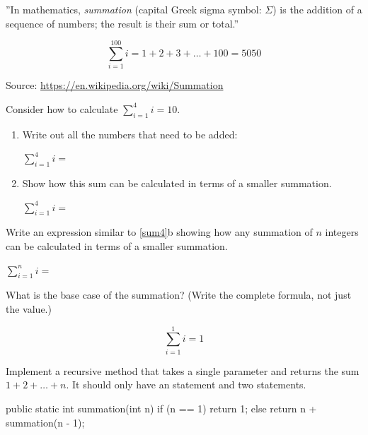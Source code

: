 
''In mathematics, \emph{summation} (capital Greek sigma symbol: $\Sigma$) is the addition of a sequence of numbers; the result is their sum or total.''

$$ \sum_{i=1}^{100} i = 1 + 2 + 3 + \ldots + 100 = 5050 $$

\smallskip\hfill
Source: \url{https://en.wikipedia.org/wiki/Summation}




\Q \label{sum4}
Consider how to calculate $\sum\limits_{i=1}^{4} i = 10$.

\begin{enumerate}
\item Write out all the numbers that need to be added:

$\sum\limits_{i=1}^{4} i =$ 

\item Show how this sum can be calculated in terms of a smaller summation.

$\sum\limits_{i=1}^{4} i =$ 
\end{enumerate}


\Q Write an expression similar to \ref{sum4}b showing how any summation of $n$ integers can be calculated in terms of a smaller summation.

\begin{center}
$\sum\limits_{i=1}^{n} i =$ 
\end{center}


\Q What is the base case of the summation? (Write the complete formula, not just the value.)

\begin{answer}
$$\sum\limits_{i=1}^{1} i = 1$$
\end{answer}


\Q Implement a recursive method  that takes a single parameter  and returns the sum $1 + 2 + \ldots + n$.
It should only have an  statement and two  statements.

\vspace{-1ex}
\begin{answer}[10em]
\begin{javaans}
public static int summation(int n) {
    if (n == 1) {
        return 1;
    } else {
        return n + summation(n - 1);
    }
}
\end{javaans}
\end{answer}


